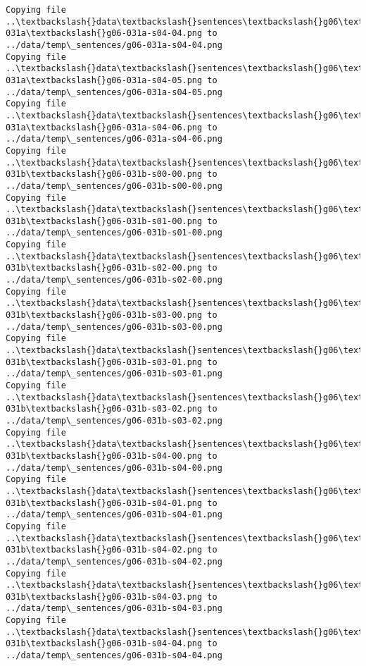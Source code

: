 \documentclass[11pt]{article}
\begin{document}
\begin{Verbatim}[commandchars=\\\{\}]
Copying file ..\textbackslash{}data\textbackslash{}sentences\textbackslash{}g06\textbackslash{}g06-031a\textbackslash{}g06-031a-s04-04.png to
../data/temp\_sentences/g06-031a-s04-04.png
Copying file ..\textbackslash{}data\textbackslash{}sentences\textbackslash{}g06\textbackslash{}g06-031a\textbackslash{}g06-031a-s04-05.png to
../data/temp\_sentences/g06-031a-s04-05.png
Copying file ..\textbackslash{}data\textbackslash{}sentences\textbackslash{}g06\textbackslash{}g06-031a\textbackslash{}g06-031a-s04-06.png to
../data/temp\_sentences/g06-031a-s04-06.png
Copying file ..\textbackslash{}data\textbackslash{}sentences\textbackslash{}g06\textbackslash{}g06-031b\textbackslash{}g06-031b-s00-00.png to
../data/temp\_sentences/g06-031b-s00-00.png
Copying file ..\textbackslash{}data\textbackslash{}sentences\textbackslash{}g06\textbackslash{}g06-031b\textbackslash{}g06-031b-s01-00.png to
../data/temp\_sentences/g06-031b-s01-00.png
Copying file ..\textbackslash{}data\textbackslash{}sentences\textbackslash{}g06\textbackslash{}g06-031b\textbackslash{}g06-031b-s02-00.png to
../data/temp\_sentences/g06-031b-s02-00.png
Copying file ..\textbackslash{}data\textbackslash{}sentences\textbackslash{}g06\textbackslash{}g06-031b\textbackslash{}g06-031b-s03-00.png to
../data/temp\_sentences/g06-031b-s03-00.png
Copying file ..\textbackslash{}data\textbackslash{}sentences\textbackslash{}g06\textbackslash{}g06-031b\textbackslash{}g06-031b-s03-01.png to
../data/temp\_sentences/g06-031b-s03-01.png
Copying file ..\textbackslash{}data\textbackslash{}sentences\textbackslash{}g06\textbackslash{}g06-031b\textbackslash{}g06-031b-s03-02.png to
../data/temp\_sentences/g06-031b-s03-02.png
Copying file ..\textbackslash{}data\textbackslash{}sentences\textbackslash{}g06\textbackslash{}g06-031b\textbackslash{}g06-031b-s04-00.png to
../data/temp\_sentences/g06-031b-s04-00.png
Copying file ..\textbackslash{}data\textbackslash{}sentences\textbackslash{}g06\textbackslash{}g06-031b\textbackslash{}g06-031b-s04-01.png to
../data/temp\_sentences/g06-031b-s04-01.png
Copying file ..\textbackslash{}data\textbackslash{}sentences\textbackslash{}g06\textbackslash{}g06-031b\textbackslash{}g06-031b-s04-02.png to
../data/temp\_sentences/g06-031b-s04-02.png
Copying file ..\textbackslash{}data\textbackslash{}sentences\textbackslash{}g06\textbackslash{}g06-031b\textbackslash{}g06-031b-s04-03.png to
../data/temp\_sentences/g06-031b-s04-03.png
Copying file ..\textbackslash{}data\textbackslash{}sentences\textbackslash{}g06\textbackslash{}g06-031b\textbackslash{}g06-031b-s04-04.png to
../data/temp\_sentences/g06-031b-s04-04.png

\end{Verbatim}
\end{document}

